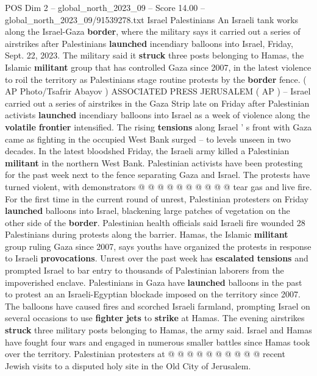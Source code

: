 \begin{textsample}{POS Dim 2 – global\_north\_2023\_09 – Score 14.00 – global\_north\_2023\_09/91539278.txt}  \label{ex:f2_pos_133}
Israel Palestinians An Israeli tank works along the Israel-Gaza \textbf{border}, where the military says it carried out a series of airstrikes after Palestinians \textbf{launched} incendiary balloons into Israel, Friday, Sept. 22, 2023.
The military said it \textbf{struck} three posts belonging to Hamas, the Islamic \textbf{militant} group that has controlled Gaza since 2007, in the latest violence to roil the territory as Palestinians stage routine protests by the \textbf{border} fence. ( AP Photo/Tsafrir Abayov ) ASSOCIATED PRESS JERUSALEM ( AP ) -- Israel carried out a series of airstrikes in the Gaza Strip late on Friday after Palestinian activists \textbf{launched} incendiary balloons into Israel as a week of violence along the \textbf{volatile} \textbf{frontier} intensified.
The rising \textbf{tensions} along Israel ' s front with Gaza came as fighting in the occupied West Bank surged -- to levels unseen in two decades.
In the latest bloodshed Friday, the Israeli army killed a Palestinian \textbf{militant} in the northern West Bank.
Palestinian activists have been protesting for the past week next to the fence separating Gaza and Israel.
The protests have turned violent, with demonstrators @ @ @ @ @ @ @ @ @ @ tear gas and live fire.
For the first time in the current round of unrest, Palestinian protesters on Friday \textbf{launched} balloons into Israel, blackening large patches of vegetation on the other side of the \textbf{border}.
Palestinian health officials said Israeli fire wounded 28 Palestinians during protests along the barrier.
Hamas, the Islamic \textbf{militant} group ruling Gaza since 2007, says youths have organized the protests in response to Israeli \textbf{provocations}.
Unrest over the past week has \textbf{escalated} \textbf{tensions} and prompted Israel to bar entry to thousands of Palestinian laborers from the impoverished enclave.
Palestinians in Gaza have \textbf{launched} balloons in the past to protest an an Israeli-Egyptian blockade imposed on the territory since 2007.
The balloons have caused fires and scorched Israeli farmland, prompting Israel on several occasions to use \textbf{fighter} \textbf{jets} to \textbf{strike} at Hamas.
The evening airstrikes \textbf{struck} three military posts belonging to Hamas, the army said.
Israel and Hamas have fought four wars and engaged in numerous smaller battles since Hamas took over the territory.
Palestinian protesters at @ @ @ @ @ @ @ @ @ @ recent Jewish visits to a disputed holy site in the Old City of Jerusalem.

\end{textsample}
